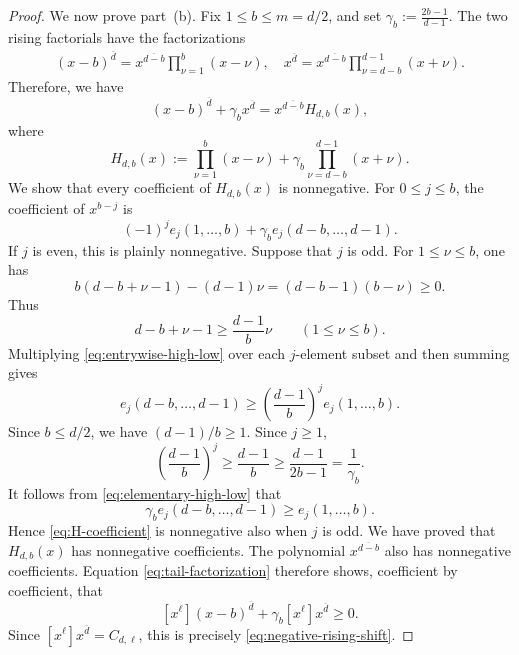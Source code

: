 \documentclass[reqno, 12pt]{article}
\numberwithin{equation}{section}
\theoremstyle{definition}
\begin{document}
\begin{proof}
We now prove part~(b).  Fix $1\leq b\leq m=d/2$, and set $\gamma_b:=\frac{2b-1}{d-1}$.
The two rising factorials have the factorizations
\begin{align*}
 (x-b)^{\overline d}=x^{\overline{d-b}}\prod_{\nu=1}^{b}(x-\nu),\quad
 x^{\overline d}=x^{\overline{d-b}}\prod_{\nu=d-b}^{d-1}(x+\nu).
\end{align*}
Therefore, we have 
\begin{equation}\label{eq:tail-factorization}
 (x-b)^{\overline d}+\gamma_bx^{\overline d}=x^{\overline{d-b}}H_{d,b}(x),
\end{equation}
where
\[ H_{d,b}(x) :=\prod_{\nu=1}^{b}(x-\nu) +\gamma_b\prod_{\nu=d-b}^{d-1}(x+\nu).
\]
We show that every coefficient of $H_{d,b}(x)$ is nonnegative.  For $0\leq j\leq b$, the coefficient of $x^{b-j}$ is
\begin{equation}\label{eq:H-coefficient}
 (-1)^je_j(1,\ldots,b)+\gamma_be_j(d-b,\ldots,d-1).
\end{equation}
If $j$ is even, this is plainly nonnegative.  Suppose that $j$ is odd.
For $1\leq\nu\leq b$, one has
\[ b(d-b+\nu-1)-(d-1)\nu =(d-b-1)(b-\nu)\geq0.
\]
Thus
\begin{equation}\label{eq:entrywise-high-low}
d-b+\nu-1\geq\frac{d-1}{b}\nu\qquad(1\leq\nu\leq b).
\end{equation}
Multiplying \eqref{eq:entrywise-high-low} over each $j$-element subset and then summing gives
\begin{equation}\label{eq:elementary-high-low}
 e_j(d-b,\ldots,d-1)\geq\left(\frac{d-1}{b}\right)^je_j(1,\ldots,b).
\end{equation}
Since $b\leq d/2$, we have $(d-1)/b\geq1$.  Since $j\geq1$,
\[\left(\frac{d-1}{b}\right)^j\geq\frac{d-1}{b}\geq\frac{d-1}{2b-1}=\frac1{\gamma_b}.
\]
It follows from \eqref{eq:elementary-high-low} that
\[\gamma_be_j(d-b,\ldots,d-1)\geq e_j(1,\ldots,b).
\]
Hence \eqref{eq:H-coefficient} is nonnegative also when $j$ is odd.
We have proved that $H_{d,b}(x)$ has nonnegative coefficients.  The polynomial $x^{\overline{d-b}}$ also has nonnegative coefficients. Equation \eqref{eq:tail-factorization} therefore shows, coefficient by
coefficient, that
\[[x^\ell](x-b)^{\overline d}+\gamma_b[x^\ell]x^{\overline d}\geq0.
\]
Since $[x^\ell]x^{\overline d}=C_{d,\ell}$, this is precisely \eqref{eq:negative-rising-shift}.
\end{proof}
\end{document}
